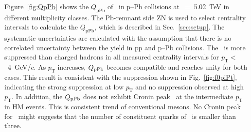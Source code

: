 Figure~\ref{fig:QpPb} shows the $Q_{\mbox{pPb}}$ of \fzero~in p--Pb collisions at \snn~=~5.02~TeV in different multiplicity classes. The Pb-remnant side ZN is used to select centrality intervals to calculate the $Q_{\mathrm{pPb}}$, which is described in Sec.~\ref{sec:setup}. The systematic uncertainties are calculated with the assumption that there is no correlated uncertainty between the yield in pp and p--Pb collisions. The \fzero~is more suppressed than charged hadrons in all measured centrality intervals for $p_{\mathrm{T}}<$~4~GeV/$c$. As $p_{\mathrm{T}}$ increases, $Q_{\rm{pPb}}$ becomes compatible and reaches unity for both cases. This result is consistent with the suppression shown in Fig.~\ref{fig:f0piPt}, indicating the strong suppression at low $p_{\mathrm{T}}$ and no suppression observed at high $p_{\mathrm{T}}$. In addition, the $Q_{\rm{pPb}}$ does not exhibit Cronin peak~\cite{Cronin:1974zm} at the intermediate $p_{\mathrm{T}}$ in HM events. This is consistent trend of conventional mesons. No Cronin peak for \fzero~might suggests that the number of constituent quarks of \fzero~is smaller than three.